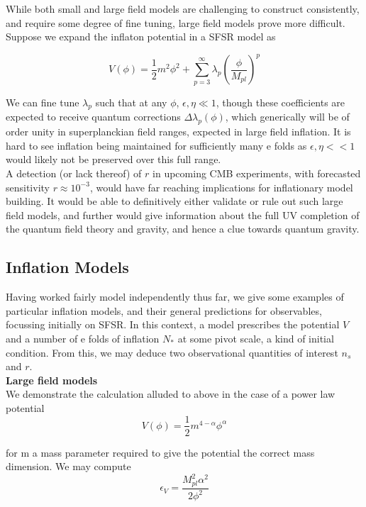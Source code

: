 \documentclass[a4paper,10pt]{article}
\newcommand{\Mp}{M_{pl}}
\newcommand{\half}{\frac{1}{2}}
\begin{document}
While both small and large field models are challenging to construct consistently, and require some degree of fine tuning, large field models prove more difficult. Suppose we expand the inflaton potential in a SFSR model as 

\begin{equation}
V(\phi) = \half m^2\phi^2 + \sum_{p=3}^\infty \lambda_p(\frac{\phi}{\Mp})^p
\end{equation}

We can fine tune $\lambda_p$ such that at any $\phi$, $\epsilon, \eta \ll 1$, though these coefficients are expected to receive quantum corrections $\Delta\lambda_p(\phi)$, which generically will be of order unity in superplanckian field ranges, expected in large field inflation. It is hard to see inflation being maintained for sufficiently many e folds as $\epsilon, \eta << 1$ would likely not be preserved over this full range. \\

A detection (or lack thereof) of $r$ in upcoming CMB experiments, with forecasted sensitivity $r\approx 10^{-3}$, would have far reaching implications for inflationary model building. It would be able to definitively either validate or rule out such large field models, and further would give information about the full UV completion of the quantum field theory and gravity, and hence a clue towards quantum gravity.

\subsection{Inflation Models}

Having worked fairly model independently thus far, we give some examples of particular inflation models, and their general predictions for observables, focussing initially on SFSR. In this context, a model prescribes the potential $V$ and a number of e folds of inflation $N_*$ at some pivot scale, a kind of initial condition. From this, we may deduce two observational quantities of interest $n_s$ and $r$. \\

\textbf{Large field models} \\

We demonstrate the calculation alluded to above in the case of a power law potential \cite{QBM}
\begin{equation}
V(\phi) = \half m^{4-\alpha}\phi^\alpha
\end{equation}

for m a mass parameter required to give the potential the correct mass dimension. We may compute 
\begin{equation}
\epsilon_V = \frac{\Mp^2\alpha^2}{2\phi^2}
\end{equation}
	
\end{document}
